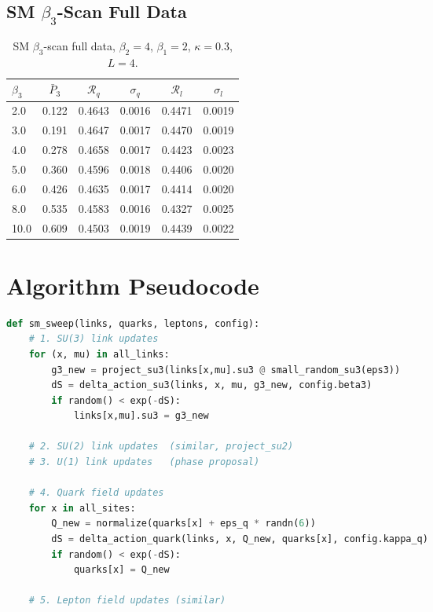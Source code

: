 \documentclass[12pt,a4paper]{article}
\newcommand{\R}{\mathcal{R}}           %
\theoremstyle{plain}
\theoremstyle{definition}
\theoremstyle{remark}
\begin{document}
\subsection{SM $\beta_3$-Scan Full Data}

\begin{table}[H]
\centering
\begin{tabular}{lccccc}
\toprule
$\beta_3$ & $\bar{P}_3$ & $\R_q$ & $\sigma_q$ & $\R_l$ & $\sigma_l$ \\
\midrule
 2.0 & 0.122 & 0.4643 & 0.0016 & 0.4471 & 0.0019 \\
 3.0 & 0.191 & 0.4647 & 0.0017 & 0.4470 & 0.0019 \\
 4.0 & 0.278 & 0.4658 & 0.0017 & 0.4423 & 0.0023 \\
 5.0 & 0.360 & 0.4596 & 0.0018 & 0.4406 & 0.0020 \\
 6.0 & 0.426 & 0.4635 & 0.0017 & 0.4414 & 0.0020 \\
 8.0 & 0.535 & 0.4583 & 0.0016 & 0.4327 & 0.0025 \\
10.0 & 0.609 & 0.4503 & 0.0019 & 0.4439 & 0.0022 \\
\bottomrule
\end{tabular}
\caption{SM $\beta_3$-scan full data, $\beta_2=4$, $\beta_1=2$, $\kappa=0.3$, $L=4$.}
\label{tab:sm_bscan_app}
\end{table}

\section{Algorithm Pseudocode}
\label{app:algo}

\begin{lstlisting}[language=Python,basicstyle=\footnotesize\ttfamily,
  caption={SM single-sweep Metropolis pseudocode.},
  label={lst:sm_sweep},
  breaklines=true]
def sm_sweep(links, quarks, leptons, config):
    # 1. SU(3) link updates
    for (x, mu) in all_links:
        g3_new = project_su3(links[x,mu].su3 @ small_random_su3(eps3))
        dS = delta_action_su3(links, x, mu, g3_new, config.beta3)
        if random() < exp(-dS):
            links[x,mu].su3 = g3_new

    # 2. SU(2) link updates  (similar, project_su2)
    # 3. U(1) link updates   (phase proposal)

    # 4. Quark field updates
    for x in all_sites:
        Q_new = normalize(quarks[x] + eps_q * randn(6))
        dS = delta_action_quark(links, x, Q_new, quarks[x], config.kappa_q)
        if random() < exp(-dS):
            quarks[x] = Q_new

    # 5. Lepton field updates (similar)
\end{lstlisting}
\end{document}
